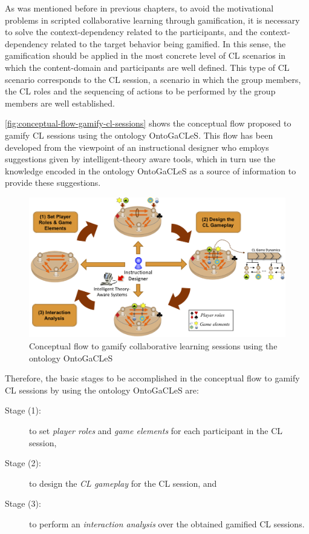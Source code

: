 As was mentioned before in previous chapters, to avoid the motivational problems in scripted collaborative learning through gamification, it is necessary to solve the context-dependency related to the participants, and the context-dependency related to the target behavior being gamified.
In this sense, the gamification should be applied in the most concrete level of CL scenarios in which the content-domain and participants are well defined.
This type of CL scenario corresponds to the CL session, a scenario in which the group members, the CL roles and the sequencing of actions to be performed by the group members are well established.

\autoref{fig:conceptual-flow-gamify-cl-sessions} shows the conceptual flow proposed to gamify CL sessions using the ontology OntoGaCLeS.
This flow has been developed from the viewpoint of an instructional designer who employs suggestions given by intelligent-theory aware tools, which in turn use the knowledge encoded in the ontology OntoGaCLeS as a source of information to provide these suggestions.

\begin{figure}[htb]
  \caption{Conceptual flow to gamify collaborative learning sessions using the ontology OntoGaCLeS}
  \label{fig:conceptual-flow-gamify-cl-sessions}
  \centering
  \includegraphics[width=1\textwidth]{images/chap-mechanisms-procedures/conceptual-flow-gamify-cl-sessions.png}
  \fautor
\end{figure}

Therefore, the basic stages to be accomplished in the conceptual flow to gamify CL sessions by using the ontology OntoGaCLeS are:

\begin{description}
\item[Stage (1):] to set \emph{player roles} and \emph{game elements} for each participant in the CL session,
\item[Stage (2):] to design the \emph{CL gameplay} for the CL session, and
\item[Stage (3):] to perform an \emph{interaction analysis} over the obtained gamified CL sessions.
\end{description}

